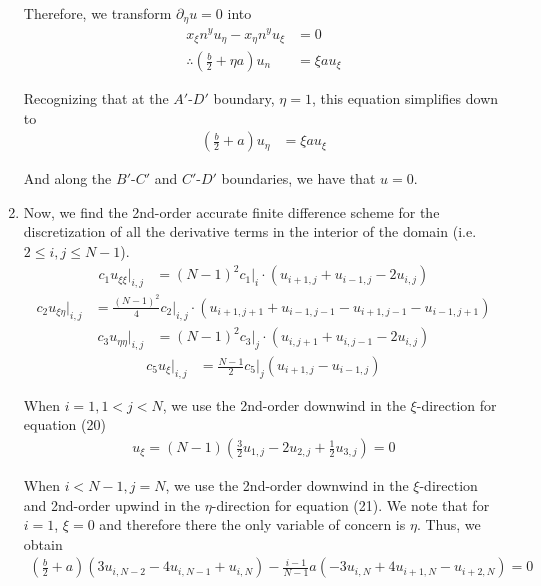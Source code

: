 \begin{enumerate}[label=(\roman*),leftmargin=*,itemsep=0mm]
    Therefore, we transform $\partial_\eta u = 0$ into
    \begin{align*}
        x_\xi n^y u_\eta - x_\eta n^y u_\xi &= 0 \\
        \therefore \left(\frac{b}{2} + \eta a\right) u_n &= \xi a u_\xi
    \end{align*}
    
    Recognizing that at the $A'$-$D'$ boundary, $\eta=1$, this equation simplifies down to
    \begin{align}
        \left(\frac{b}{2} + a\right) u_\eta &= \xi a u_\xi
    \end{align}
    
    And along the $B'$-$C'$ and $C'$-$D'$ boundaries, we have that $u = 0$.
    
    \item Now, we find the 2nd-order accurate finite difference scheme for the discretization of all the derivative terms in the interior of the domain (i.e. $2 \leq i,j \leq N-1$).
    \begin{align}
        c_1u_{\xi\xi} |_{i,j} 
        &= (N-1)^2 c_1|_{i} \cdot \left(u_{i+1,j} + u_{i-1,j} - 2 u_{i,j} \right)
    \end{align}
    \begin{align}
        c_2u_{\xi\eta} |_{i,j} &= \frac{(N-1)^2}{4} c_2 |_{i,j} \cdot (u_{i+1,j+1} + u_{i-1,j-1} - u_{i+1,j-1} - u_{i-1,j+1})
    \end{align}
    \begin{align}
        c_3u_{\eta\eta} |_{i,j} &= (N-1)^2 c_3|_{j} \cdot (u_{i,j+1} + u_{i,j-1} - 2u_{i,j})
    \end{align}
    \begin{align}
       c_5u_\xi |_{i,j} &= \frac{N-1}{2} c_5|_j (u_{i+1,j}-u_{i-1,j})
    \end{align}
    
    When $i=1, 1 < j < N$, we use the 2nd-order downwind in the $\xi$-direction for equation (20)
    \begin{align}
        u_\xi
        = (N-1) \left( \frac{3}{2}u_{1,j} - 2u_{2,j} + \frac{1}{2}u_{3,j} \right) = 0
    \end{align}
    
    When $i < N-1, j = N$, we use the 2nd-order downwind in the $\xi$-direction and 2nd-order upwind in the $\eta$-direction for equation (21).  We note that for $i=1$, $\xi = 0$ and therefore there the only variable of concern is $\eta$.  Thus, we obtain
    \begin{align}
        \left(\frac{b}{2} + a\right) \left(3u_{i,N-2} - 4u_{i,N-1} + u_{i,N} \right)
        - \frac{i-1}{N-1} a \left(-3u_{i,N} + 4u_{i+1,N} - u_{i+2,N} \right) = 0
    \end{align}
    

\end{enumerate}
